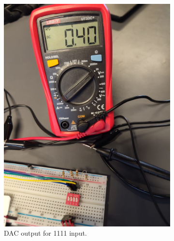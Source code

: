 \begin{figure}[H]
\begin{subfigure}[]{0.3\textwidth}
\includegraphics[width=\linewidth]{./Figures/DAC_Prac_1111.jpeg}
\caption{DAC output for 1111 input.}
\label{subfig:dac_prac_1111}
\end{subfigure}
\hfill
\begin{subfigure}[]{0.3\textwidth}

\end{subfigure}
\end{figure}
